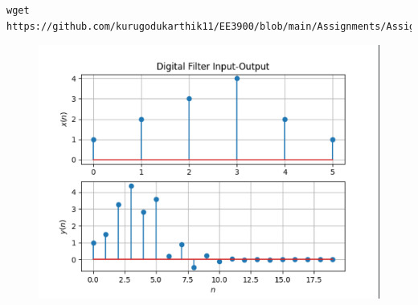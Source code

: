 \documentclass[journal,12pt,twocolumn]{IEEEtran}
\renewcommand\thesection{\arabic{section}}
\begin{document}
\begin{enumerate}[label=\thesection.\arabic*,ref=\thesection.\theenumi]
\begin{lstlisting}
wget https://github.com/kurugodukarthik11/EE3900/blob/main/Assignments/Assignment_1/codes/xny.cpp
\end{lstlisting}
\begin{figure}[!ht]
\begin{center}
\includegraphics[width=\columnwidth]{./figs/xny}
\end{center}
\label{fig:xnyn}	
\end{figure}\bigskip\bigskip
\end{enumerate}
\end{document}
